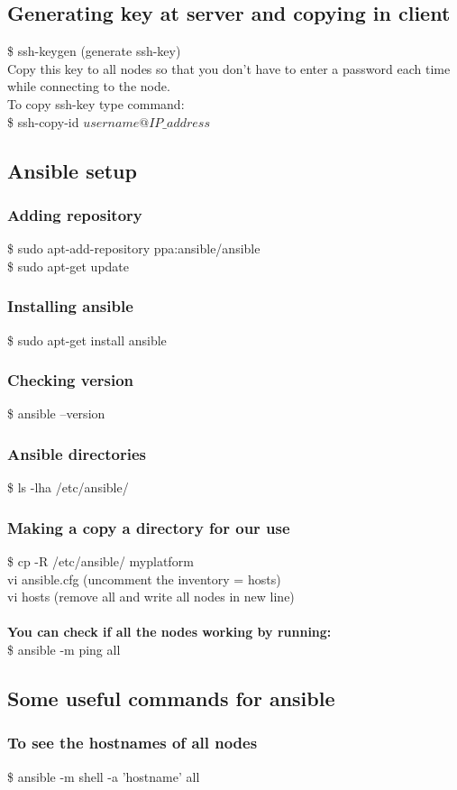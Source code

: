 \documentclass[12pt]{article}
\begin{document}
\subsection{Generating key at server and copying in client}
\$ ssh-keygen (generate ssh-key)\\
Copy this key to all nodes so that you don’t have to enter a password each time while connecting to the node.\\
To copy ssh-key type command:\\
\$ ssh-copy-id $username@IP\_address$
\subsection{Ansible setup}
\subsubsection{Adding repository}
\$ sudo apt-add-repository ppa:ansible/ansible\\
\$ sudo apt-get update
\subsubsection{Installing ansible}
\$ sudo apt-get install ansible
\subsubsection{Checking version}
\$ ansible  --version
\subsubsection{Ansible directories}
\$ ls -lha /etc/ansible/
\subsubsection{Making a copy a directory for our use}
\$ cp -R /etc/ansible/ myplatform\\
vi ansible.cfg (uncomment the inventory =  hosts)\\
vi hosts (remove all and write all nodes in new line)\\\\
\textbf{You can check if all the nodes working by running:}\\
\$ ansible -m ping all
\subsection{Some useful commands for ansible}
\subsubsection{To see the hostnames of all nodes}
\$ ansible -m shell -a 'hostname' all
\end{document}
